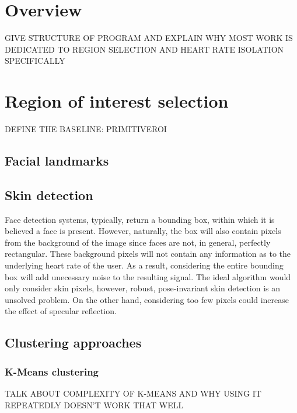 \section{Overview}
GIVE STRUCTURE OF PROGRAM AND EXPLAIN WHY MOST WORK IS DEDICATED TO REGION
SELECTION AND HEART RATE ISOLATION SPECIFICALLY

\section{Region of interest selection}
DEFINE THE BASELINE: PRIMITIVEROI
\subsection{Facial landmarks}
\subsection{Skin detection}
Face detection systems, typically, return a bounding box, within which it is believed
a face is present. However, naturally, the box will also contain pixels from the background of 
the image since faces are not, in general, perfectly rectangular.
These background pixels will not contain any information as to the underlying heart rate of the user.
As a result, considering the entire bounding box will add unecessary noise to the resulting signal.
The ideal algorithm would only consider skin pixels, however, robust, pose-invariant skin detection is an unsolved problem.
On the other hand, considering too few pixels could increase the effect of specular reflection.

\subsection{Clustering approaches}
\subsubsection{K-Means clustering}
TALK ABOUT COMPLEXITY OF K-MEANS AND WHY USING IT REPEATEDLY DOESN'T WORK THAT WELL
